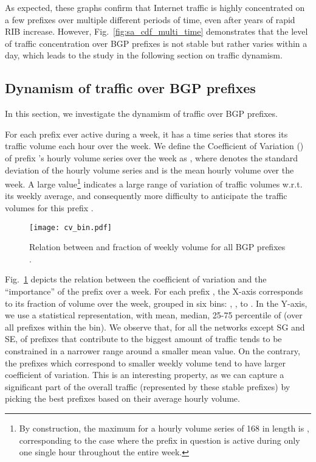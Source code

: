 \documentclass[10pt, conference,letterpaper]{IEEEtran}
\begin{document}
As expected, these graphs confirm that Internet traffic is highly concentrated on a few prefixes over multiple different periods of time, even after years of rapid RIB increase.
However, Fig.~\ref{fig:sa_cdf_multi_time} demonstrates that the level of traffic concentration over BGP prefixes is not stable but rather varies within a day, which leads to the study in the following section on traffic dynamism.

\subsection{Dynamism of traffic over BGP prefixes}
\label{sec:dyna}
In this section, we investigate the dynamism of traffic over BGP prefixes. 


For each prefix  ever active during a week, it has a time series  that
stores its traffic volume each hour over the week. 
We define the Coefficient of Variation () of prefix 's hourly volume series over the week as
 ,
where  denotes the standard deviation of the hourly volume series and  is the mean hourly volume over the week.
A large  value\footnote{By construction, the maximum  for a hourly volume series of 168 in length is , corresponding to the case where the prefix in question is active during only one single hour throughout the entire week.} indicates  a large range of variation of traffic volumes w.r.t. its weekly average, and consequently more difficulty to anticipate the traffic volumes for this prefix  \cite{He2005}.
\begin{figure}[!tb]
\centering
\texttt{[image: cv\_bin.pdf]}
\caption{Relation between   and  fraction of weekly volume for all BGP prefixes . 
}
\label{fig:cv}
\end{figure}

Fig.~\ref{fig:cv} depicts the relation between the coefficient of variation and the ``importance'' of the prefix over a week. For each prefix ,  the X-axis corresponds to its fraction of volume over the week, grouped in six bins: , , to . In the Y-axis, we use a statistical representation, with mean, median, 25-75 percentile of  (over all prefixes  within the bin).
We observe that, for all the networks except SG and SE,  of prefixes that contribute to the biggest amount of traffic tends to be constrained in a narrower range around a smaller mean value. On the contrary, the prefixes which correspond to smaller weekly volume tend to have larger coefficient of variation. 
This is an interesting property, as we can capture a significant part of the overall traffic (represented by these stable prefixes) by picking the best prefixes based on their average hourly volume. 
\end{document}
